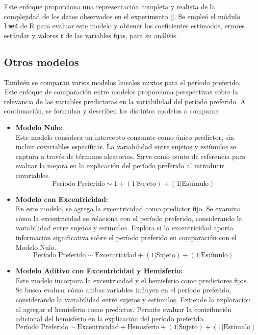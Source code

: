 Este enfoque proporciona una representación completa y realista de la complejidad de los datos observados en el experimento [\cite{broderick_mapping_2022}]. Se empleó el módulo \texttt{lme4} de R para evaluar este modelo y obtener los coeficientes estimados, errores estándar y valores t de las variables fijas, para su análisis.


\subsection{Otros modelos} \label{compare_mlm}

Tambi\'en se comparan varios modelos lineales mixtos para el período preferido. Este enfoque de comparación entre modelos proporciona perspectivas sobre la relevancia de las variables predictoras en la variabilidad del período preferido. A continuación, se formulan y describen los distintos modelos a comparar:

\begin{itemize}
	\item \textbf{Modelo Nulo:}	\\
	Este modelo considera un intercepto constante como único predictor, sin incluir covariables específicas. La variabilidad entre sujetos y estímulos se captura a través de términos aleatorios. Sirve como punto de referencia para evaluar la mejora en la explicación del período preferido al introducir covariables.
	\begin{equation}
		\text{Período Preferido} \sim 1 + (1 | \text{Sujeto}) + (1 | \text{Estímulo})	
		\label{m_1}
	\end{equation}

	\item\textbf{Modelo con Excentricidad:}\\
	En este modelo, se agrega la excentricidad como predictor fijo. Se examina cómo la excentricidad se relaciona con el período preferido, considerando la variabilidad entre sujetos y estímulos. Explora si la excentricidad aporta información significativa sobre el período preferido en comparación con el Modelo Nulo.
	\begin{equation}
		\text{Período Preferido} \sim \text{Excentricidad} + (1 | \text{Sujeto}) + (1 | \text{Estímulo})	
		\label{m_2}
	\end{equation}

	\item \textbf{Modelo Aditivo con Excentricidad y Hemisferio:}\\
	Este modelo incorpora la excentricidad y el hemisferio como predictores fijos. Se busca evaluar cómo ambas variables influyen en el período preferido, considerando la variabilidad entre sujetos y estímulos. Extiende la exploración al agregar el hemisferio como predictor. Permite evaluar la contribución adicional del hemisferio en la explicación del período preferido.
	\begin{equation}
		\text{Período Preferido} \sim \text{Excentricidad} + \text{Hemisferio} + (1 | \text{Sujeto}) + (1 | \text{Estímulo})	
		\label{m_3}
	\end{equation}
	
\end{itemize}

